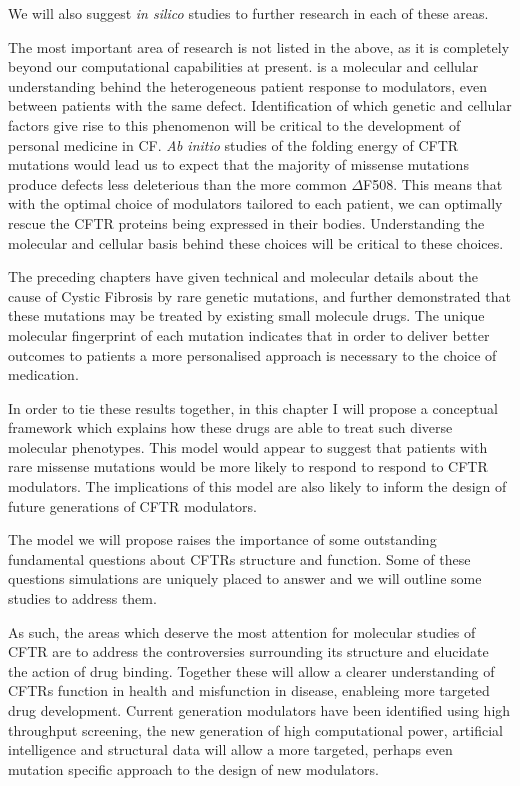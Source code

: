 We will also suggest \textit{in silico} studies to further research in each of these areas.

The most important area of research is not listed in the above, as it is completely beyond our computational capabilities at present. is a molecular and cellular understanding behind the heterogeneous patient response to modulators, even between patients with the same defect. Identification of which genetic and cellular factors give rise to this phenomenon will be critical to the development of personal medicine in CF. \textit{Ab initio} studies of the folding energy of CFTR mutations would lead us to expect that the majority of missense mutations produce defects less deleterious than the more common $\Delta$F508. This means that with the optimal choice of modulators tailored to each patient, we can optimally rescue the CFTR proteins being expressed in their bodies. Understanding the molecular and cellular basis behind these choices will be critical to these choices.

The preceding chapters have given technical and molecular details about the cause of Cystic Fibrosis by rare genetic mutations, and further demonstrated that these mutations may be treated by existing small molecule drugs. The unique molecular fingerprint of each mutation indicates that in order to deliver better outcomes to patients a more personalised approach is necessary to the choice of medication. 

In order to tie these results together, in this chapter I will propose a conceptual framework which explains how these drugs are able to treat such diverse molecular phenotypes. This model would appear to suggest that patients with rare missense mutations would be more likely to respond to respond to CFTR modulators. The implications of this model are also likely to inform the design of future generations of CFTR modulators. 

The model we will propose raises the importance of some outstanding fundamental questions about CFTRs structure and function. Some of these questions simulations are uniquely placed to answer and we will outline some studies to address them. 

As such, the areas which deserve the most attention for molecular studies of CFTR are to address the controversies surrounding its structure and elucidate the action of drug binding. Together these will allow a clearer understanding of CFTRs function in health and misfunction in disease, enableing more targeted drug development. Current generation modulators have been identified using high throughput screening, the new generation of high computational power, artificial intelligence and structural data will allow a more targeted, perhaps even mutation specific approach to the design of new modulators.


